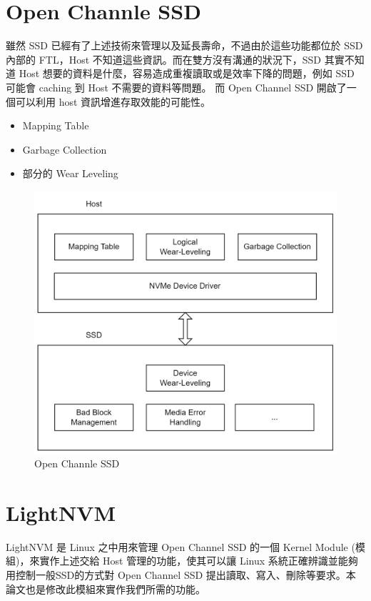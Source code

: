 \section{Open Channle SSD}\label{s2.3}
\indent
雖然 SSD 已經有了上述技術來管理以及延長壽命，不過由於這些功能都位於 SSD 內部的 FTL，Host 不知道這些資訊。而在雙方沒有溝通的狀況下，SSD 其實不知道 Host 想要的資料是什麼，容易造成重複讀取或是效率下降的問題，例如 SSD 可能會 caching 到 Host 不需要的資料等問題。
而 Open Channel SSD 開啟了一個可以利用 host 資訊增進存取效能的可能性。
\begin{itemize}
    \item Mapping Table
    \item Garbage Collection
    \item 部分的 Wear Leveling
\end{itemize}
\begin{figure}[H]
    \centering
    \includegraphics[width=1\textwidth]{picture/ch2/OPSSD.png}
    \caption{Open Channle SSD\cite{OPSSD}}
    \label{f2.8}
\end{figure}

\section{LightNVM}\label{s2.4}
\indent
LightNVM 是 Linux 之中用來管理 Open Channel SSD 的一個 Kernel Module (模組)，來實作上述交給 Host 管理的功能，使其可以讓 Linux 系統正確辨識並能夠用控制一般SSD的方式對 Open Channel SSD 提出讀取、寫入、刪除等要求。本論文也是修改此模組來實作我們所需的功能。

